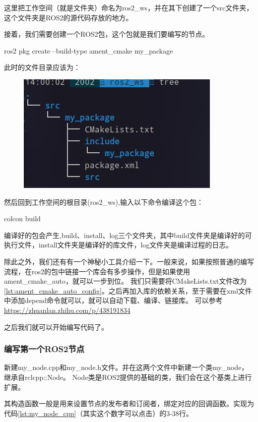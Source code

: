 这里把工作空间（就是文件夹）命名为ros2\_ws，并在其下创建了一个src文件夹，这个文件夹是ROS2的源代码存放的地方。

接着，我们需要创建一个ROS2包，这个包就是我们要编写的节点。
\begin{tbash}
    ros2 pkg create --build-type ament_cmake my_package
\end{tbash}
此时的文件目录应该为：
\begin{figure}
    \centering
    \includegraphics{Chapter4/img/treeofws.png}
    \label{fig:treeofws}
\end{figure}

然后回到工作空间的根目录(ros2\_ws),输入以下命令编译这个包：

\begin{tbash}
    colcon build
\end{tbash}

编译好的包会产生,build、install、log三个文件夹，其中build文件夹是编译好的可执行文件，install文件夹是编译好的库文件，log文件夹是编译过程的日志。

除此之外，我们还有有一个神秘小工具介绍一下。一般来说，如果按照普通的编写流程，在ros2的包中链接一个库会有多步操作，但是如果使用ament\_cmake\_auto，就可以一步到位。
我们只需要将CMakeLists.txt文件改为\ref{lst:ament_cmake_auto_config}。之后再加入库的依赖关系，至于需要在xml文件中添加depend命令就可以，就可以自动下载、编译、链接库。
可以参考\url{https://zhuanlan.zhihu.com/p/438191834}

之后我们就可以开始编写代码了。
\subsubsection{编写第一个ROS2节点}

新建my\_node.cpp和my\_node.h文件。并在这两个文件中新建一个类my\_node，继承自rclcpp::Node。
Node类是ROS2提供的基础的类，我们会在这个基类上进行扩展。

其构造函数一般是用来设置节点的发布者和订阅者，绑定对应的回调函数。实现为代码\ref{lst:my_node_cpp}（其实这个数字可以点击）的3-38行。
